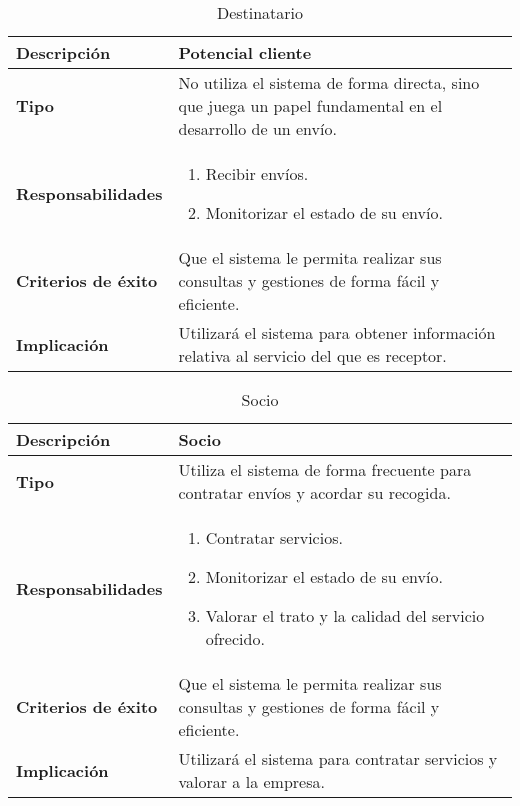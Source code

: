 \documentclass[12pt,spanish]{article}
\begin{document}

\begin{table}[H]
\begin{center}
\begin{tabular}{|l|m{10cm}|}
\hline
\textbf{Descripción} & Potencial cliente \\
\hline
\textbf{Tipo} & No utiliza el sistema de forma directa, sino que juega un papel fundamental en el desarrollo de un envío. \\
\hline
\textbf{Responsabilidades} & 
\begin{minipage}{5in}
    \vskip 1pt
    \begin{enumerate}
   \item Recibir envíos.
   \item Monitorizar el estado de su envío.
   \end{enumerate}
   \vskip 1pt
 \end{minipage}\\ 
\hline
\textbf{Criterios de éxito} & Que el sistema le permita realizar sus consultas y gestiones de forma fácil y eficiente.\\
\hline
\textbf{Implicación} & Utilizará el sistema para obtener información relativa al servicio del que es receptor. \\
\hline
\end{tabular}
\caption{Destinatario}
\end{center}
\end{table}


\begin{table}[H]
\begin{center}
\begin{tabular}{|l|m{10cm}|}
\hline
\textbf{Descripción} & Socio \\
\hline
\textbf{Tipo} & Utiliza el sistema de forma frecuente para contratar envíos y acordar su recogida. \\
\hline
\textbf{Responsabilidades} & 
\begin{minipage}{5in}
    \vskip 1pt
    \begin{enumerate}
   		\item Contratar servicios.
   		\item Monitorizar el estado de su envío.
     	\item Valorar el trato y la calidad del servicio ofrecido.
   \end{enumerate}
   \vskip 1pt
 \end{minipage}\\ 
\hline
\textbf{Criterios de éxito} & Que el sistema le permita realizar sus consultas y gestiones de forma fácil y eficiente.\\
\hline
\textbf{Implicación} & Utilizará el sistema para contratar servicios y valorar a la empresa. \\
\hline
\end{tabular}
\caption{Socio}
\end{center}
\end{table}
\end{document}
